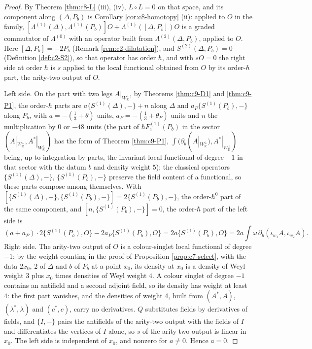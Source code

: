\begin{proof}
By Theorem \ref{thm:c8-L} (iii), (iv), $L\circ L=0$ on that space, and its component along $(\Delta,P_b)$ is Corollary \ref{cor:c8-homotopy} (ii): applied to $O$ in the family, $[\Lambda^{(1)}(\Delta),\Lambda^{(1)}(P_b)]O+\Lambda^{(1)}([\Delta,P_b])O$ is a graded commutator of $\Lambda^{(0)}$ with an operator built from $\Lambda^{(2)}(\Delta,P_b)$, applied to $O$. Here $[\Delta,P_b]=-2P_b$ (Remark \ref{rem:c2-dilatation}), and $S^{(2)}(\Delta,P_b)=0$ (Definition \ref{def:c2-S2}), so that operator has order $\hbar$, and with $sO=0$ the right side at order $\hbar$ is $s$ applied to the local functional obtained from $O$ by its order-$\hbar$ part, the arity-two output of $O$.

Left side. On the part with two legs $A|_{W_{\mathbb R}^\perp}$, by Theorems \ref{thm:c9-D1} and \ref{thm:c9-P1}, the order-$\hbar$ parts are $a\{S^{(1)}(\Delta),-\}+n$ along $\Delta$ and $a_P\{S^{(1)}(P_b),-\}$ along $P_b$, with $a=-(\tfrac13+\theta)$ units, $a_P=-(\tfrac13+\theta_P)$ units and $n$ the multiplication by $0$ or $-48$ units (the part of $\hbar F_1^{(1)}(P_b)$ in the sector $(A|_{W_{\mathbb R}^\perp},A^*|_{W_{\mathbb R}^\perp})$ has the form of Theorem \ref{thm:c9-P1}, $\int(\partial_b(A|_{W_{\mathbb R}^\perp}),A^*|_{W_{\mathbb R}^\perp})$ being, up to integration by parts, the invariant local functional of degree $-1$ in that sector with the datum $b$ and density weight $5$); the classical operators $\{S^{(1)}(\Delta),-\}$, $\{S^{(1)}(P_b),-\}$ preserve the field content of a functional, so these parts compose among themselves. With $[\{S^{(1)}(\Delta),-\},\{S^{(1)}(P_b),-\}]=2\{S^{(1)}(P_b),-\}$, the order-$\hbar^0$ part of the same component, and $[n,\{S^{(1)}(P_b),-\}]=0$, the order-$\hbar$ part of the left side is
\[
(a+a_P)\cdot2\{S^{(1)}(P_b),O\}-2a_P\{S^{(1)}(P_b),O\}=2a\{S^{(1)}(P_b),O\}=2a\int\omega\,\partial_b(\iota_{w_1}A,\iota_{w_2}A).
\]
Right side. The arity-two output of $O$ is a colour-singlet local functional of degree $-1$; by the weight counting in the proof of Proposition \ref{prop:c7-select}, with the data $2x_0$, $2$ of $\Delta$ and $b$ of $P_b$ at a point $x_0$, its density at $x_0$ is a density of Weyl weight $3$ plus $x_0$ times densities of Weyl weight $4$. A colour singlet of degree $-1$ contains an antifield and a second adjoint field, so its density has weight at least $4$: the first part vanishes, and the densities of weight $4$, built from $(A^*,A)$, $(\lambda^*,\lambda)$ and $(c^*,c)$, carry no derivatives. $Q$ substitutes fields by derivatives of fields, and $\{I,-\}$ pairs the antifields of the arity-two output with the fields of $I$ and differentiates the vertices of $I$ alone, so $s$ of the arity-two output is linear in $x_0$. The left side is independent of $x_0$, and nonzero for $a\neq0$. Hence $a=0$.
\end{proof}

